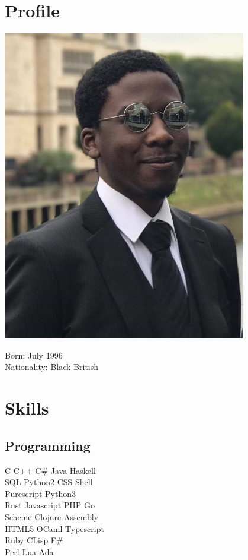 \documentclass[11pt, a4paper]{cv}
\begin{document}
\begin{minipage}[t]{0.33\textwidth} %

\section{Profile}

\includegraphics[width=0.8\textwidth]{profile.jpg}

Born: July 1996 \\
Nationality: Black British

\section{Skills}

\subsection{Programming}

C \textbullet{} C++ \textbullet{} C\# \textbullet{} Java \textbullet{} Haskell \\
SQL \textbullet{} Python2 \textbullet{} CSS \textbullet{} Shell \\
Purescript \textbullet{} Python3 \textbullet{} \LaTeXe\  \\\vspace{4pt}
Rust \textbullet{} Javascript \textbullet{} PHP \textbullet{} Go \\
Scheme \textbullet{} Clojure \textbullet{} Assembly \\
{\small HTML5} \textbullet{} OCaml \textbullet{} Typescript\\\vspace{4pt}
Ruby \textbullet{} CLisp \textbullet{} F\# \\
Perl \textbullet{} Lua \textbullet{} Ada


\end{minipage}
\end{document}
